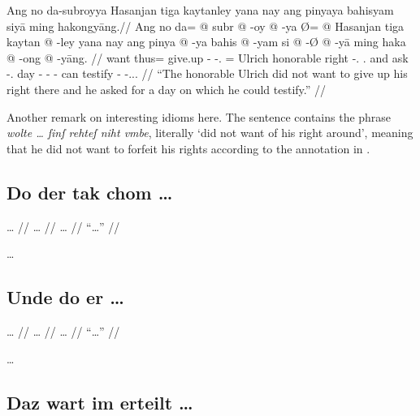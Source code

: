 \documentclass[12pt,paper=a4]{scrartcl}
\newcommand{\fw}[1]{\textit{#1}} %
\begin{document}

\ex \begingl
	\glpreamble Ang no da-subroyya Hasanjan tiga kaytanley yana nay 
		ang pinyaya bahisyam siyā ming ha\-kong\-yāng.//
	\gla Ang no da= @ subr @ -oy @ -ya Ø= @ Hasanjan tiga kaytan @ -ley yana 
		nay ang pinya @ -ya bahis @ -yam si @ -Ø @ -yā ming haka @ -ong 
		@ -yāng. //
	\glb \AgtT{} want thus= give.up -\Neg{} -\Tsg{}.\M{} \Top{}= Ulrich 
		honorable right -\Parg{}.\Inan{} \Tsg{}.\Gen{} and \AgtT{} ask 
		-\Tsg{}.\M{} day -\Dat{} \Rel{} -\Dat{} -\Loc{} can testify 
		-\Irr{} -\Tsg{}.\M{}.\Aarg{}. //
	\glft \enquote{The honorable Ulrich did not want to give up his right 
		there and he asked for a day on which he could testify.} //
\endgl \xe

Another remark on interesting idioms here. The \Mhg{} sentence contains the 
phrase \fw{wolte … ſinſ rehteſ niht vmbe}, literally `did not want of his 
right around', meaning that he did not want to forfeit his rights according to 
the annotation in \textcite{n163-online}.

\subsection*{Do der tak chom …}


\ex \begingl
	\glpreamble … //
	\gla … //
	\glb … //
	\glft \enquote{…} //
\endgl \xe

…

\subsection*{Unde do er …}


\ex \begingl
	\glpreamble … //
	\gla … //
	\glb … //
	\glft \enquote{…} //
\endgl \xe

…

\subsection*{Daz wart im erteilt …}
\end{document}
